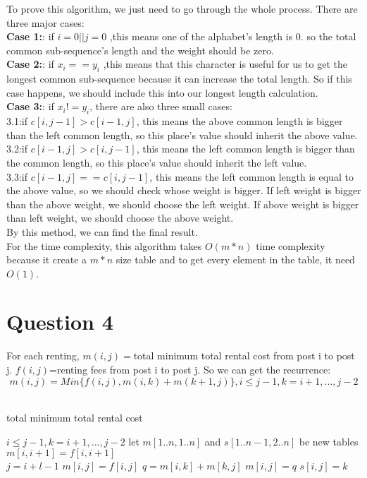 \documentclass[paper=a4, fontsize=11pt]{scrartcl} %
\numberwithin{equation}{section} %
\numberwithin{figure}{section} %
\numberwithin{table}{section} %
\begin{document}
To prove this algorithm, we just need to go through the whole process. There are three major cases:\\
\textbf{Case 1:}: if $i=0 || j=0$ ,this means one of the alphabet's length is 0. so the total common sub-sequence's length and the weight should be zero.\\
\textbf{Case 2:}: if $x_i==y_i$ ,this means that this character is useful for us to get the longest common sub-sequence because it can increase the total length. So if this case happens, we should include this into our longest length calculation.\\
\textbf{Case 3:}: if $x_i!=y_i$, there are also three small cases:\\
    3.1:if $c[i,j-1]>c[i-1,j]$, this means the above common length is bigger than the left common length, so this place's value should inherit the above value.\\
    3.2:if $c[i-1,j]>c[i,j-1]$, this means the left common length is bigger than the common length, so this place's value should inherit the left value.\\
    3.3:if $c[i-1,j]==c[i,j-1]$, this means the left common length is equal to the above value, so we should check whose weight is bigger. If left weight is bigger than the above weight, we should choose the left weight. If above weight is bigger than left weight, we should choose the above weight.\\
By this method, we can find the final result.\\
For the time complexity, this algorithm takes $O(m*n)$ time complexity because it create a $m*n$ size table and to get every element in the table, it need $O(1)$.

\vspace{2cm}
\section{\textbf{Question 4}}
For each renting, $m(i,j)=$total minimum total rental cost from post i to post j. $f(i,j)$=renting fees from post i to post j.
So we can get the recurrence:
$$m(i,j)=Min\{ f(i,j),m(i,k)+m(k+1,j) \},i\leq j-1, k=i+1,...,j-2$$\\
\begin{algorithm}
  \caption{total minimum total rental cost}
  \begin{algorithmic}
  \REQUIRE $i\leq j-1, k=i+1,...,j-2$
  \STATE let $m[1..n,1..n]$ and $s[1..n-1,2..n]$ be new tables\\
  \STATE  $m[i,i+1]=f[i,i+1]$\\
  \ENDFOR
    \STATE $j=i+l-1$
    \STATE $m[i,j]=f[i,j]$
        \STATE $q=m[i,k]+m[k,j]$
        \STATE $m[i,j]=q$
        \STATE $s[i,j]=k$
        \ENDIF
        \ENDFOR
    \ENDFOR
  \ENDFOR
  \end{algorithmic}
\end{algorithm}
\end{document}
